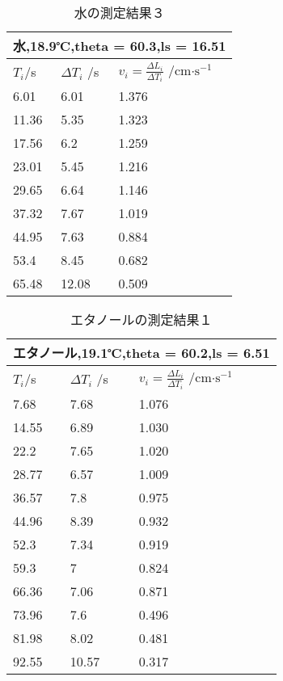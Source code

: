 \documentclass{jsarticle}
\begin{document}
\begin{table}[H]
\centering
\caption{水の測定結果３}
\label{my-label}
\begin{tabular}{|l|l|l|}
\hline
\multicolumn{3}{|l|}{水,18.9℃,theta = 60.3,ls = 16.51} \\ \hline
$T_i $/s   & $\Delta T_i $ /s  & $v_i = \frac{\Delta L_i}{\Delta T_i}$ /cm$\cdot \textrm{s}^{-1}$   \\ \hline
6.01           & 6.01           & 1.376         \\ \hline
11.36          & 5.35           & 1.323         \\ \hline
17.56          & 6.2            & 1.259         \\ \hline
23.01          & 5.45           & 1.216         \\ \hline
29.65          & 6.64           & 1.146         \\ \hline
37.32          & 7.67           & 1.019         \\ \hline
44.95          & 7.63           & 0.884         \\ \hline
53.4           & 8.45           & 0.682         \\ \hline
65.48          & 12.08          & 0.509         \\ \hline
\end{tabular}
\end{table}

\begin{table}[H]
\centering
\caption{エタノールの測定結果１}
\label{my-label}
\begin{tabular}{|l|l|l|}
\hline
\multicolumn{3}{|l|}{エタノール,19.1℃,theta = 60.2,ls = 6.51} \\ \hline
$T_i $/s   & $\Delta T_i $ /s  & $v_i = \frac{\Delta L_i}{\Delta T_i}$ /cm$\cdot \textrm{s}^{-1}$   \\ \hline
7.68            & 7.68            & 1.076          \\ \hline
14.55           & 6.89            & 1.030          \\ \hline
22.2            & 7.65            & 1.020          \\ \hline
28.77           & 6.57            & 1.009          \\ \hline
36.57           & 7.8             & 0.975          \\ \hline
44.96           & 8.39            & 0.932          \\ \hline
52.3            & 7.34            & 0.919          \\ \hline
59.3            & 7               & 0.824          \\ \hline
66.36           & 7.06            & 0.871          \\ \hline
73.96           & 7.6             & 0.496          \\ \hline
81.98           & 8.02            & 0.481          \\ \hline
92.55           & 10.57           & 0.317          \\ \hline
\end{tabular}
\end{table}
\end{document}
